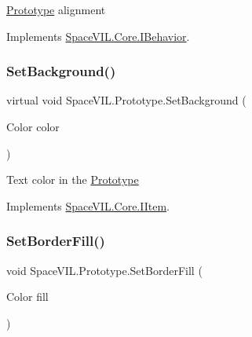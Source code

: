 \mbox{\hyperlink{class_space_v_i_l_1_1_prototype}{Prototype}} alignment 



Implements \mbox{\hyperlink{interface_space_v_i_l_1_1_core_1_1_i_behavior}{Space\+V\+I\+L.\+Core.\+I\+Behavior}}.

\mbox{\label{class_space_v_i_l_1_1_prototype_aa35761db5812bd6125ab380ad38b9a46}} 
\subsubsection{\texorpdfstring{Set\+Background()}{SetBackground()}}
{\footnotesize\ttfamily virtual void Space\+V\+I\+L.\+Prototype.\+Set\+Background (\begin{DoxyParamCaption}\item[{Color}]{color }\end{DoxyParamCaption})\hspace{0.3cm}{\ttfamily [virtual]}}



Text color in the \mbox{\hyperlink{class_space_v_i_l_1_1_prototype}{Prototype}} 



Implements \mbox{\hyperlink{interface_space_v_i_l_1_1_core_1_1_i_item}{Space\+V\+I\+L.\+Core.\+I\+Item}}.

\mbox{\label{class_space_v_i_l_1_1_prototype_a85d92e82dcd890f026c72bb04dfa2dd3}} 
\subsubsection{\texorpdfstring{Set\+Border\+Fill()}{SetBorderFill()}}
{\footnotesize\ttfamily void Space\+V\+I\+L.\+Prototype.\+Set\+Border\+Fill (\begin{DoxyParamCaption}\item[{Color}]{fill }\end{DoxyParamCaption})}



